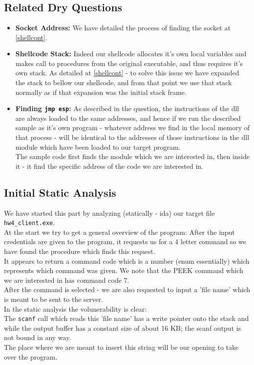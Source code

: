 \documentclass{article}
\begin{document}
\section{}
\subsection{Related Dry Questions}
\begin{itemize}
    \item \textbf{Socket Address:} We have detailed the process of finding the socket
    at \ref{shellcont}.
    \item  \textbf{Shellcode Stack:} Indeed our shellcode allocates
    it's own local variables and makes call to procedures from the
    original executable, and thus requires it's own stack. As detailed
    at \ref{shellcont} - to solve this issue we have expanded the stack
    to bellow our shellcode, and from that point we use that stack
    normally as if that expansion was the initial stack frame.
    \item \textbf{Finding \texttt{jmp esp}:} As described in the question,
    the instructions of the dll are always loaded to the same addresses,
    and hence if we run the described sample as it's own program - 
    whatever address we find in the local memory of that process - 
    will be identical to the addresses of those instructions
    in the dll module which have been loaded to our target program.\\
    The sample code first finds the module which we are interested in,
    then inside it - it find the specific address of the code we are interested in.
\end{itemize}

\subsection{Initial Static Analysis}
We have started this part by analyzing (statically - ida) our target file \texttt{hw4\_client.exe}.\\
At the start we try to get a general overview of the program:
After the input credentials are given to the program,
it requests us for a 4 letter command so
we have found the procedure which finds this request.\\
It appears to return a command code which is a number (enum essentially)
which represents which command was given. We note that the
PEEK command which we are interested in has command code 7.\\
After the command is selected - we are also requested
to input a 'file name' which is meant to be sent to the server.\\
In the static analysis the volunerability is clear:\\
The \texttt{scanf} call which reads this 'file name'
has a write pointer onto the stack and while the output buffer
has a constant size of about 16 KB; the scanf output
is not bound in any way.\\
The place where we are meant to insert this string will be our opening to take
over the program.\\
\end{document}
